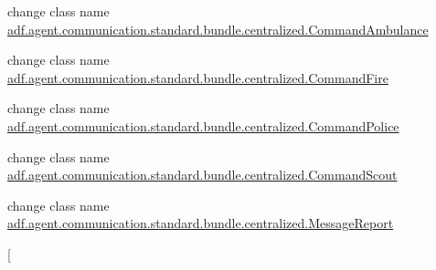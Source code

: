 
\begin{DoxyRefList}
\item[\label{deprecated__deprecated000001}%
\hypertarget{deprecated__deprecated000001}{}%
クラス \hyperlink{classadf_1_1agent_1_1communication_1_1standard_1_1bundle_1_1topdown_1_1CommandAmbulance}{adf.agent.communication.standard.bundle.topdown.Command\+Ambulance} ]change class name \hyperlink{classadf_1_1agent_1_1communication_1_1standard_1_1bundle_1_1centralized_1_1CommandAmbulance}{adf.\+agent.\+communication.\+standard.\+bundle.\+centralized.\+Command\+Ambulance}  
\item[\label{deprecated__deprecated000002}%
\hypertarget{deprecated__deprecated000002}{}%
クラス \hyperlink{classadf_1_1agent_1_1communication_1_1standard_1_1bundle_1_1topdown_1_1CommandFire}{adf.agent.communication.standard.bundle.topdown.Command\+Fire} ]change class name \hyperlink{classadf_1_1agent_1_1communication_1_1standard_1_1bundle_1_1centralized_1_1CommandFire}{adf.\+agent.\+communication.\+standard.\+bundle.\+centralized.\+Command\+Fire}  
\item[\label{deprecated__deprecated000003}%
\hypertarget{deprecated__deprecated000003}{}%
クラス \hyperlink{classadf_1_1agent_1_1communication_1_1standard_1_1bundle_1_1topdown_1_1CommandPolice}{adf.agent.communication.standard.bundle.topdown.Command\+Police} ]change class name \hyperlink{classadf_1_1agent_1_1communication_1_1standard_1_1bundle_1_1centralized_1_1CommandPolice}{adf.\+agent.\+communication.\+standard.\+bundle.\+centralized.\+Command\+Police}  
\item[\label{deprecated__deprecated000004}%
\hypertarget{deprecated__deprecated000004}{}%
クラス \hyperlink{classadf_1_1agent_1_1communication_1_1standard_1_1bundle_1_1topdown_1_1CommandScout}{adf.agent.communication.standard.bundle.topdown.Command\+Scout} ]change class name \hyperlink{classadf_1_1agent_1_1communication_1_1standard_1_1bundle_1_1centralized_1_1CommandScout}{adf.\+agent.\+communication.\+standard.\+bundle.\+centralized.\+Command\+Scout}  
\item[\label{deprecated__deprecated000005}%
\hypertarget{deprecated__deprecated000005}{}%
クラス \hyperlink{classadf_1_1agent_1_1communication_1_1standard_1_1bundle_1_1topdown_1_1MessageReport}{adf.agent.communication.standard.bundle.topdown.Message\+Report} ]change class name \hyperlink{classadf_1_1agent_1_1communication_1_1standard_1_1bundle_1_1centralized_1_1MessageReport}{adf.\+agent.\+communication.\+standard.\+bundle.\+centralized.\+Message\+Report}  
\item[\label{deprecated__deprecated000006}%

\end{DoxyRefList}
